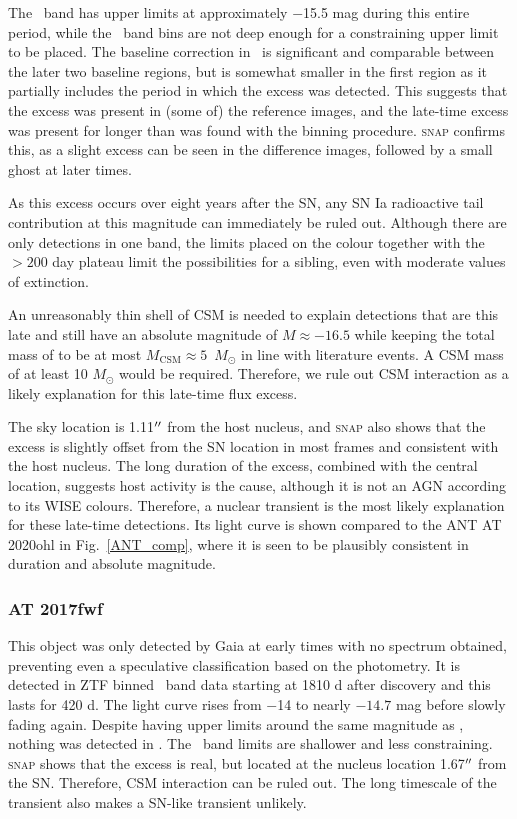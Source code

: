 \documentclass[a4paper,oneside,12pt, class=Latex/Classes/PhDthesisPSnPDF, crop=false]{standalone}
\begin{document}
The \ztfg\ band has upper limits at approximately $-$15.5 mag during this entire period, while the \ztfi\ band bins are not deep enough for a constraining upper limit to be placed. The baseline correction in \ztfr\ is significant and comparable between the later two baseline regions, but is somewhat smaller in the first region as it partially includes the period in which the excess was detected. This suggests that the excess was present in (some of) the reference images, and the late-time excess was present for longer than was found with the binning procedure. \textsc{snap} confirms this, as a slight excess can be seen in the difference images, followed by a small ghost at later times.

As this excess occurs over eight years after the SN, any SN Ia radioactive tail contribution at this magnitude can immediately be ruled out. Although there are only detections in one band, the limits placed on the colour together with the $>200$ day plateau limit the possibilities for a sibling, even with moderate values of extinction.

An unreasonably thin shell of CSM is needed to explain detections that are this late and still have an absolute magnitude of $M \approx -16.5$ while keeping the total mass of to be at most $M_\text{CSM} \approx 5$~$M_\odot$ in line with literature events. A CSM mass of at least 10 $M_\odot$ would be required. Therefore, we rule out CSM interaction as a likely explanation for this late-time flux excess. 

The sky location is 1.11$^{\prime\prime}$ from the host nucleus, and \textsc{snap} also shows that the excess is slightly offset from the SN location in most frames and consistent with the host nucleus. The long duration of the excess, combined with the central location, suggests host activity is the cause, although it is not an AGN according to its WISE colours.  Therefore, a nuclear transient is the most likely explanation for these late-time detections. Its light curve is shown compared to the ANT AT 2020ohl in Fig.~\ref{ANT_comp}, where it is seen to be plausibly consistent in duration and absolute magnitude.


\subsubsection*{AT 2017fwf}
This object was only detected by Gaia at early times with no spectrum obtained, preventing even a speculative classification based on the photometry. It is detected in ZTF binned \ztfr\ band data starting at 1810 d after discovery and this lasts for 420 d. The light curve rises from $-$14 to nearly $-14.7$ mag before slowly fading again. Despite having upper limits around the same magnitude as \ztfr, nothing was detected in \ztfg. The \ztfi\ band limits are shallower and less constraining. \textsc{snap} shows that the excess is real, but located at the nucleus location 1.67$^{\prime\prime}$ from the SN. Therefore, CSM interaction can be ruled out. The long timescale of the transient also makes a SN-like transient unlikely. 
\end{document}
